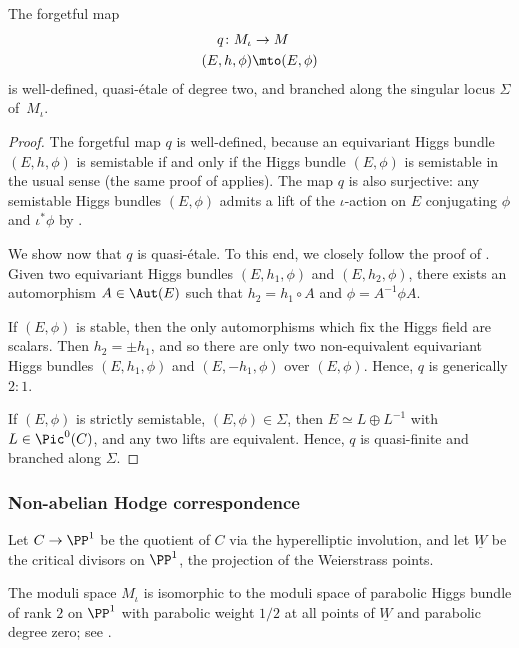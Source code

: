 \begin{prop}\label{prop:forgetfulmap}
The forgetful map
\begin{align*}
q \colon M_{\iota} &\to M\\
(E, h, \phi) &\mto (E, \phi)
\end{align*}
is well-defined, quasi-étale of degree two, and branched along the singular locus $\Sigma$ of~$M_{\iota}$.
\end{prop}
\begin{proof}
The forgetful map $q$ is well-defined, because an equivariant Higgs bundle $(E, h, \phi)$ is semistable if and only if the Higgs bundle $(E, \phi)$ is semistable in the usual sense (the same proof of \cite[Lem.\,2.7]{Biswas05} applies).
The map $q$ is also surjective: any semistable Higgs bundles $(E, \phi)$ admits a lift of the $\iota$-action on $E$ conjugating $\phi$ and $\iota^*\phi$ by \cite[Chap.\,6,\,p.\,74, \& Th.\,2.1]{HeuLoray19}.

We show now that $q$ is quasi-étale. To this end, we closely follow the proof of \cite[Th.\,2.1]{Kumar00}. Given two equivariant Higgs bundles $(E, h_1, \phi)$ and $(E, h_2, \phi)$, there exists an automorphism $A \in \Aut(E)$ such that $h_2=h_1 \circ A$ and $\phi=A^{-1}\phi A$.

If $(E, \phi)$ is stable, then the only automorphisms which fix the Higgs field are scalars. Then $h_2=\pm h_1$, and so there are only two non-equivalent equivariant Higgs bundles $(E, h_1, \phi)$ and $(E, -h_1, \phi)$ over $(E, \phi)$. Hence, $q$ is generically $2:1$.

If $(E, \phi)$ is strictly semistable, \ie $(E, \phi) \in \Sigma$, then $E \simeq L \oplus L^{-1}$ with $L \in \Pic^0(C)$, and any two lifts are equivalent. Hence, $q$ is quasi-finite and branched along $\Sigma$.
\end{proof}

\subsubsection{Non-abelian Hodge correspondence}
Let $C \to \PP^1$ be the quotient of $C$ via the hyperelliptic involution, and let $\underline{W}$ be the critical divisors on $\PP^1$, \ie the projection of the Weierstrass points.

The moduli space $M_{\iota}$ is isomorphic to the moduli space of parabolic Higgs bundle of rank $2$ on $\PP^1$ with parabolic weight $1/2$ at all points of $\underline{W}$ and parabolic degree zero; see \cite[Th.\,3.5]{BIM13}.

